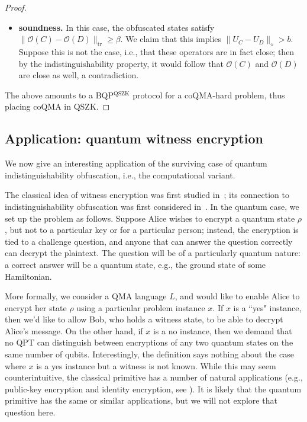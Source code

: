 \documentclass[11pt]{article}
\numberwithin{equation}{section}
\begin{document}
{\begin{proof}
\begin{itemize}
\item \textbf{soundness.} In this case, the obfuscated states satisfy $\|\mathcal O(C) - \mathcal O(D)\|_\text{tr} \geq \beta$. We claim that this implies $\|U_C - U_D\|_\diamond > b$. Suppose this is not the case, i.e., that these operators are in fact close; then by the indistinguishability property, it would follow that $\mathcal O(C)$ and $\mathcal O(D)$ are close as well, a contradiction.
\end{itemize}
The above amounts to a BQP$^\text{QSZK}$ protocol for a coQMA-hard problem, thus placing coQMA in QSZK.
\end{proof}

\subsection{Application: quantum witness encryption}

We now give an interesting application of the surviving case of quantum indistinguishability obfuscation, i.e., the computational variant.

The classical idea of witness encryption was first studied in~\cite{GGSW13}; its connection to indistinguishability obfuscation was first considered in~\cite{GGHRSW13}. In the quantum case, we set up the problem as follows. Suppose Alice wishes to encrypt a quantum state $\rho$, but not to a particular key or for a particular person; instead, the encryption is tied to a challenge question, and anyone that can answer the question correctly can decrypt the plaintext. The question will be of a particularly quantum nature: a correct answer will be a quantum state, e.g., the ground state of some Hamiltonian.

More formally, we consider a QMA language $L$, %
and would like to enable Alice to encrypt her state $\rho$ using a particular problem instance $x$. %
If $x$ is a ``yes" instance, %
then we'd like to allow Bob, who holds a witness state, to be able to decrypt Alice's message.  On the other hand, if $x$ is a no instance, then we demand that no QPT can distinguish between encryptions of any two quantum states  on the same number of qubits.  Interestingly, the definition says nothing about the case where $x$ is a yes instance but a witness is not known. While this may seem counterintuitive, the classical primitive has a number of natural applications (e.g., public-key encryption and identity encryption, see \cite{GGSW13}). It is likely that the quantum primitive has the same or similar applications, but we will not explore that question here.

}
\end{document}
